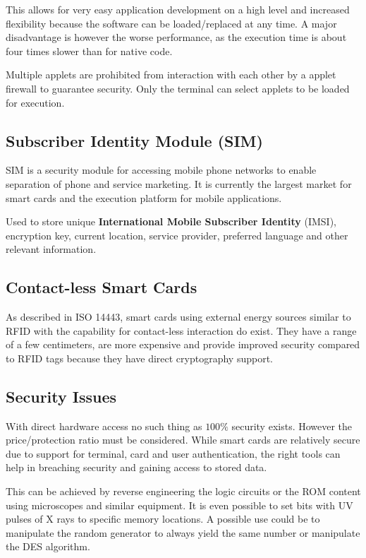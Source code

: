 \documentclass{article}
\begin{document}
\begin{multicols}{2}
This allows for very easy application development on a high level and increased
flexibility because the software can be loaded/replaced at any time. A major
disadvantage is however the worse performance, as the execution time is about
four times slower than for native code.

Multiple applets are prohibited from interaction with each other by a applet
firewall to guarantee security. Only the terminal can select applets to be
loaded for execution.

\subsection{Subscriber Identity Module (SIM)}
SIM is a security module for accessing mobile phone networks to enable
separation of phone and service marketing. It is currently the largest market
for smart cards and the execution platform for mobile applications.

Used to store unique {\bf International Mobile Subscriber Identity} (IMSI),
encryption key, current location, service provider, preferred language and other
relevant information.

\subsection{Contact-less Smart Cards}
As described in ISO 14443, smart cards using external energy sources similar to
RFID with the capability for contact-less interaction do exist. They have a
range of a few centimeters, are more expensive and provide improved security
compared to RFID tags because they have direct cryptography support.


\subsection{Security Issues}
With direct hardware access no such thing as $100 \%$ security exists. However
the price/protection ratio must be considered. While smart cards are relatively
secure due to support for terminal, card and user authentication, the right
tools can help in breaching security and gaining access to stored data.

This can be achieved by reverse engineering the logic circuits or the ROM
content using microscopes and similar equipment. It is even possible to set bits
with UV pulses of X rays to specific memory locations. A possible use could be
to manipulate the random generator to always yield the same number or manipulate
the DES algorithm.


\end{multicols}
\end{document}
